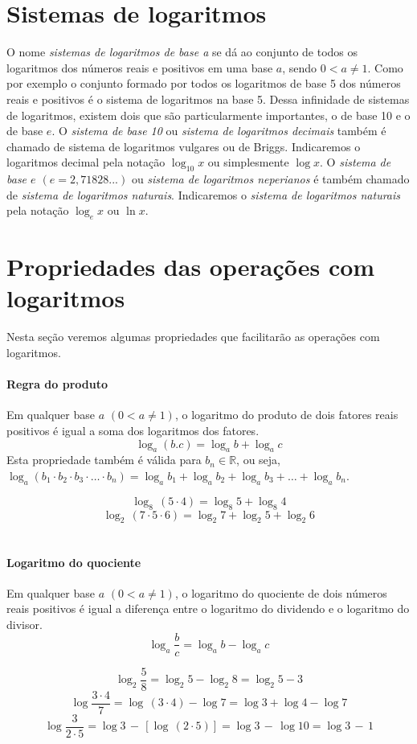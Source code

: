 \section{Sistemas de logaritmos}
O nome \emph{sistemas de logaritmos de base a} se dá ao conjunto de todos os logaritmos dos números reais e positivos em uma base $a$, sendo $0 < a \neq 1$. Como por exemplo o conjunto formado por todos os logaritmos de base 5 dos números reais e positivos é o sistema de logaritmos na base 5.
Dessa infinidade de sistemas de logaritmos, existem dois que são particularmente importantes, o de base 10 e o de base $e$.
O \emph{sistema de base 10} ou \emph{sistema de logaritmos decimais} também é chamado de sistema de logaritmos vulgares ou de Briggs. Indicaremos o logaritmos decimal pela notação $\log_10 x$ ou simplesmente $\log x$.
O \emph{sistema de base $e$ $(e = 2,71828...)$} ou \emph{sistema de logaritmos neperianos} é também chamado de \emph{sistema de logaritmos naturais}. Indicaremos o \emph{sistema de logaritmos naturais} pela notação $\log_e x$ ou $\ln x$.

\section[Operações com Logaritmos]{Propriedades das operações com logaritmos}
Nesta seção veremos algumas propriedades que facilitarão as operações com logaritmos.

\paragraph{Regra do produto}
Em qualquer base $a$ $(0 < a \neq 1)$, o logaritmo do produto de dois fatores reais positivos é igual a soma dos logaritmos dos fatores.
\[\log_a (b.c) = \log_a b + \log_a c\]
Esta propriedade também é válida para $b_n \in \mathbb{R}$, ou seja, $\log_a ( b_1 \cdot  b_2 \cdot  b_3 \cdot \ldots \cdot b_n) = \log_a b_1 + \log_a b_2 + \log_a b_3 + \ldots + \log_a b_n$.

\begin{exemplo}
\[\log_8 \,(5 \cdot 4) = \log_8 5 + \log_8 4\]
\[\log_2 \,(7 \cdot 5 \cdot 6) = \log_2 7 + \log_2 5 + \log_2 6\]\\
\end{exemplo}

\paragraph{Logaritmo do quociente}
Em qualquer base $a$ $(0 < a \neq 1)$, o logaritmo do quociente de dois números reais positivos é igual a diferença entre o logaritmo do dividendo e o logaritmo do divisor.
\[\log_a \dfrac{b}{c} = \log_a b - \log_a c\]
\begin{exemplo}
\[\log_2 \dfrac{5}{8} = \log_2 5 - \log_2 8=\log_2 5 - 3\]
\[\log \dfrac{3 \cdot 4}{7} = \log \,(3 \cdot 4) - \log7= \log 3 + \log 4 - \log 7\]
\[\log \frac{3}{2 \cdot 5} = \log 3\, - \,[\log \,(2 \cdot 5)] = \log 3 \, -\, \log 10 = \log 3\, -\, 1\]\\
\end{exemplo}

